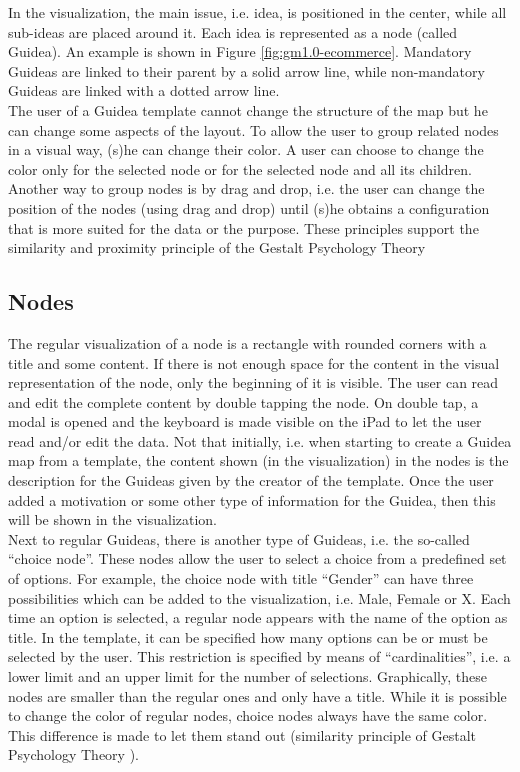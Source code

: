 In the visualization, the main issue, i.e. idea, is positioned in the center, while all sub-ideas are placed around it. Each idea is represented as a node (called Guidea). An example is shown in Figure \ref{fig:gm1.0-ecommerce}. Mandatory Guideas are linked to their parent by a solid arrow line, while non-mandatory Guideas are linked with a dotted arrow line.\\

The user of a Guidea template cannot change the structure of the map but he can change some aspects of the layout. To allow the user to group related nodes in a visual way, (s)he can change their color. A user can choose to change the color only for the selected node or for the selected node and all its children. Another way to group nodes is by drag and drop, i.e. the user can change the position of the nodes (using drag and drop) until (s)he obtains a configuration that is more suited for the data or the purpose. These principles support the similarity and proximity principle of the Gestalt Psychology Theory \citep{koffka2013principles}

\subsection{Nodes}\label{sec:nodes}
The regular visualization of a node is a rectangle with rounded corners with a title and some content. If there is not enough space for the content in the visual representation of the node, only the beginning of it is visible. The user can read and edit the complete content by double tapping the node. On double tap, a modal is opened and the keyboard is made visible on the iPad to let the user read and/or edit the data. Not that initially, i.e. when starting to create a Guidea map from a template, the content shown (in the visualization) in the nodes is the description for the Guideas given by the creator of the template. Once the user added a motivation or some other type of information for the Guidea, then this will be shown in the visualization.\\

Next to regular Guideas, there is another type of Guideas, i.e. the so-called ``choice node''. These nodes allow the user to select a choice from a predefined set of options. For example, the choice node with title ``Gender'' can have three possibilities which can be added to the visualization, i.e. Male, Female or X. Each time an option is selected, a regular node appears with the name of the option as title. In the template, it can be specified how many options can be or must be selected by the user. This restriction is specified by means of ``cardinalities'', i.e. a lower limit and an upper limit for the number of selections. Graphically, these nodes are smaller than the regular ones and only have a title. While it is possible to change the color of regular nodes, choice nodes always have the same color. This difference is made to let them stand out (similarity principle of Gestalt Psychology Theory \citep{koffka2013principles}).\\

